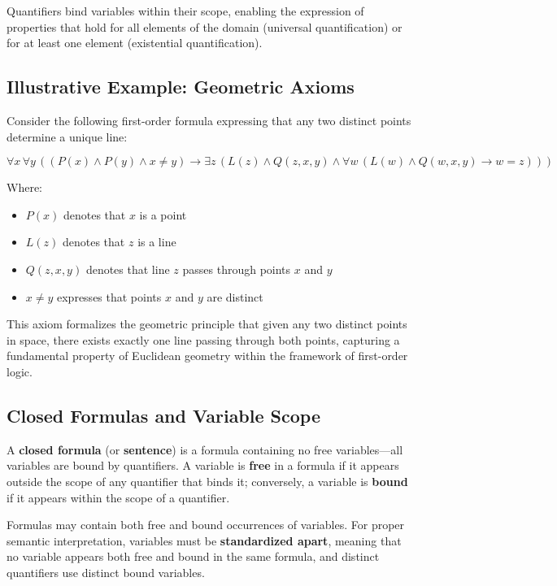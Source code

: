 \documentclass[11pt,a4paper]{article}
\theoremstyle{definition}
\theoremstyle{plain}
\theoremstyle{remark}
\begin{document}
Quantifiers bind variables within their scope, enabling the expression of properties that hold for all elements of the domain (universal quantification) or for at least one element (existential quantification).

\subsection{Illustrative Example: Geometric Axioms}

Consider the following first-order formula expressing that any two distinct points determine a unique line:

\[
\forall x \, \forall y \, \left( (P(x) \wedge P(y) \wedge x \neq y) \rightarrow \exists z \, (L(z) \wedge Q(z, x, y) \wedge \forall w \, (L(w) \wedge Q(w, x, y) \rightarrow w = z)) \right)
\]

Where:
\begin{itemize}
    \item $P(x)$ denotes that $x$ is a point
    \item $L(z)$ denotes that $z$ is a line
    \item $Q(z, x, y)$ denotes that line $z$ passes through points $x$ and $y$
    \item $x \neq y$ expresses that points $x$ and $y$ are distinct
\end{itemize}


This axiom formalizes the geometric principle that given any two distinct points in space, there exists exactly one line passing through both points, capturing a fundamental property of Euclidean geometry within the framework of first-order logic.

\subsection{Closed Formulas and Variable Scope}

A \textbf{closed formula} (or \textbf{sentence}) is a formula containing no free variables---all variables are bound by quantifiers. A variable is \textbf{free} in a formula if it appears outside the scope of any quantifier that binds it; conversely, a variable is \textbf{bound} if it appears within the scope of a quantifier.

Formulas may contain both free and bound occurrences of variables. For proper semantic interpretation, variables must be \textbf{standardized apart}, meaning that no variable appears both free and bound in the same formula, and distinct quantifiers use distinct bound variables.
\end{document}
